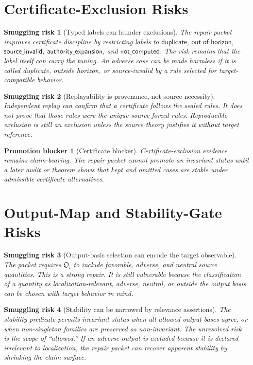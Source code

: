 \documentclass[11pt]{article}
\newcommand{\OutFam}{\mathfrak{O}}
\newtheorem{smugglingrisk}{Smuggling risk}
\newtheorem{promotionblocker}{Promotion blocker}
\begin{document}
\section{Certificate-Exclusion Risks}

\begin{smugglingrisk}[Typed labels can launder exclusions]
The repair packet improves certificate discipline by restricting labels to
\(\mathsf{duplicate}\), \(\mathsf{out\_of\_horizon}\),
\(\mathsf{source\_invalid}\), \(\mathsf{authority\_expansion}\), and
\(\mathsf{not\_computed}\). The risk remains that the label itself can carry
the tuning. An adverse case can be made harmless if it is called duplicate,
outside horizon, or source-invalid by a rule selected for target-compatible
behavior.
\end{smugglingrisk}

\begin{smugglingrisk}[Replayability is provenance, not source necessity]
Independent replay can confirm that a certificate follows the sealed rules.
It does not prove that those rules were the unique source-forced rules.
Reproducible exclusion is still an exclusion unless the source theory
justifies it without target reference.
\end{smugglingrisk}

\begin{promotionblocker}[Certificate blocker]
Certificate-exclusion evidence remains claim-bearing. The repair packet
cannot promote an invariant status until a later audit or theorem shows that
kept and omitted cases are stable under admissible certificate alternatives.
\end{promotionblocker}

\section{Output-Map and Stability-Gate Risks}

\begin{smugglingrisk}[Output-basis selection can encode the target observable]
The packet requires \(\OutFam_i\) to include favorable, adverse, and neutral
source quantities. This is a strong repair. It is still vulnerable because
the classification of a quantity as localization-relevant, adverse, neutral,
or outside the output basis can be chosen with target behavior in mind.
\end{smugglingrisk}

\begin{smugglingrisk}[Stability can be narrowed by relevance assertions]
The stability predicate permits invariant status when all allowed output
bases agree, or when non-singleton families are preserved as non-invariant.
The unresolved risk is the scope of ``allowed.'' If an adverse output is
excluded because it is declared irrelevant to localization, the repair packet
can recover apparent stability by shrinking the claim surface.
\end{smugglingrisk}
\end{document}
